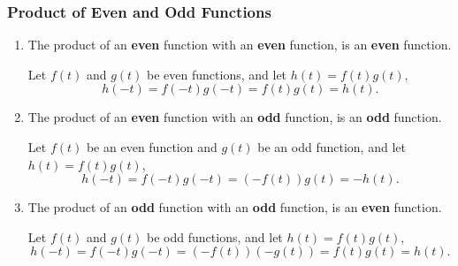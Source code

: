 \documentclass{article}
\begin{document}
\subsubsection{Product of Even and Odd Functions}
\begin{enumerate}
    \item The product of an \textbf{even} function with an
          \textbf{even} function, is an \textbf{even} function.

          Let \(f\left( t \right)\) and \(g\left( t \right)\) be even
          functions, and let \(h\left( t \right) = f\left( t \right)
          g\left( t \right)\),
          \begin{equation*}
              h\left( -t \right) = f\left( -t \right) g\left( -t \right) = f\left( t \right) g\left( t \right) = h\left( t \right).
          \end{equation*}
    \item The product of an \textbf{even} function with an \textbf{odd}
          function, is an \textbf{odd} function.

          Let \(f\left( t \right)\) be an even function and \(g\left( t
          \right)\) be an odd function, and let \(h\left( t \right) =
          f\left( t \right) g\left( t \right)\),
          \begin{equation*}
              h\left( -t \right) = f\left( -t \right) g\left( -t \right) = \left( -f\left( t \right) \right) g\left( t \right) = -h\left( t \right).
          \end{equation*}
    \item The product of an \textbf{odd} function with an \textbf{odd}
          function, is an \textbf{even} function.

          Let \(f\left( t \right)\) and \(g\left( t \right)\) be odd
          functions, and let \(h\left( t \right) = f\left( t \right)
          g\left( t \right)\),
          \begin{equation*}
              h\left( -t \right) = f\left( -t \right) g\left( -t \right) = \left( -f\left( t \right) \right) \left( -g\left( t \right) \right) = f\left( t \right) g\left( t \right) = h\left( t \right).
          \end{equation*}
\end{enumerate}
\end{document}
